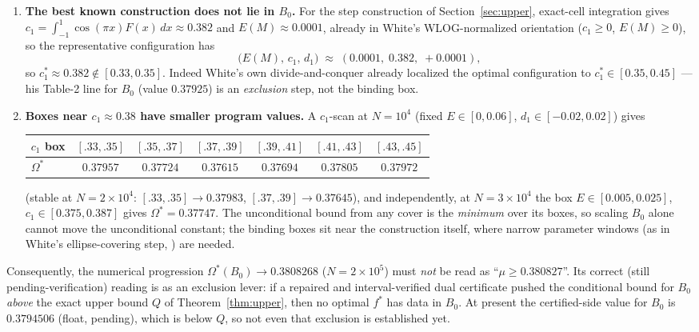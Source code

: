 \documentclass[11pt]{article}
\theoremstyle{remark}
\begin{document}
\begin{enumerate}
\item \textbf{The best known construction does not lie in $B_0$.} For the
step construction of Section~\ref{sec:upper}, exact-cell integration gives
$c_1 = \int_{-1}^1 \cos(\pi x) F(x)\,dx \approx 0.382$ and
$E(M) \approx 0.0001$, already in White's WLOG-normalized orientation
($c_1 \ge 0$, $E(M) \ge 0$), so the representative configuration has
\[
\bigl(E(M),\, c_1,\, d_1\bigr) \;\approx\; (0.0001,\; 0.382,\; +0.0001),
\]
so $c_1^\ast \approx 0.382 \notin [0.33, 0.35]$. Indeed White's own
divide-and-conquer \cite[eq.~(5.16)]{White22} already localized the optimal
configuration to $c_1^\ast \in [0.35, 0.45]$ --- his Table-2 line for $B_0$
(value $0.37925$) is an \emph{exclusion} step, not the binding box.
\item \textbf{Boxes near $c_1 \approx 0.38$ have smaller program values.}
A $c_1$-scan at $N = 10^4$ (fixed $E \in [0, 0.06]$,
$d_1 \in [-0.02, 0.02]$) gives
\begin{center}
\begin{tabular}{l|cccccc}
$c_1$ box & $[.33,.35]$ & $[.35,.37]$ & $[.37,.39]$ & $[.39,.41]$ &
$[.41,.43]$ & $[.43,.45]$\\
\hline
$\Omega^\ast$ & $0.37957$ & $0.37724$ & $\mathbf{0.37615}$ & $0.37694$ &
$0.37805$ & $0.37972$
\end{tabular}
\end{center}
(stable at $N = 2\times10^4$: $[.33,.35] \to 0.37983$,
$[.37,.39] \to 0.37645$), and independently, at $N = 3\times10^4$ the box
$E \in [0.005, 0.025]$, $c_1 \in [0.375, 0.387]$ gives
$\Omega^\ast = 0.37747$. The unconditional bound from any cover is the
\emph{minimum} over its boxes, so scaling $B_0$ alone cannot move the
unconditional constant; the binding boxes sit near the construction itself,
where narrow parameter windows (as in White's ellipse-covering step,
\cite[Table~3]{White22}) are needed.
\end{enumerate}

Consequently, the numerical progression
$\Omega^\ast(B_0) \to 0.3808268$ ($N = 2\times10^5$) must \emph{not} be read
as ``$\mu \ge 0.380827$''. Its correct (still pending-verification) reading
is as an exclusion lever: if a repaired and interval-verified dual
certificate pushed the conditional bound for $B_0$ \emph{above} the exact
upper bound $Q$ of Theorem~\ref{thm:upper}, then no optimal $f^\ast$ has
data in $B_0$. At present the certified-side value for $B_0$ is
$0.3794506$ (float, pending), which is below $Q$, so not even that
exclusion is established yet.
\end{document}
